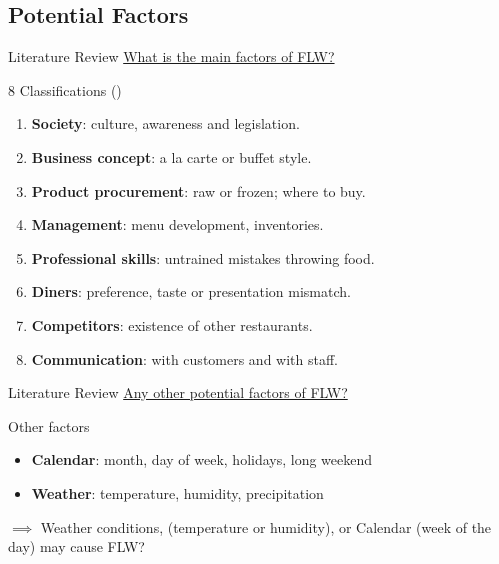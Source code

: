 \documentclass{beamer}
\begin{document}
\subsection{Potential Factors}
\begin{frame}{Literature Review}
    \underline{What is the main factors of FLW?}
    \begin{block}{8 Classifications (\cite{Heikkila2016-el})}
        \begin{enumerate}
            \item \textbf{Society}: \small culture, awareness and legislation.
            \item \textbf{Business concept}: \small a la carte or buffet style.
            \item \textbf{Product procurement}: \small raw or frozen; where to buy.
            \item \textbf{Management}: \small menu development, inventories.
            \item \textbf{Professional skills}: \small untrained mistakes throwing food.
            \item \textbf{Diners}: \small preference, taste or presentation mismatch.
            \item \textbf{Competitors}: \small existence of other restaurants.
            \item \textbf{Communication}: \small with customers and with staff.
        \end{enumerate}
    \end{block}    
\end{frame}

\begin{frame}{Literature Review}
    \underline{Any other potential factors of FLW?}
    \begin{block}{Other factors}
        \begin{itemize}
            \item \textbf{Calendar}: month, day of week, holidays, long weekend
            \item \textbf{Weather}: temperature, humidity, precipitation
        \end{itemize}       
    \end{block}
    $\implies$ Weather conditions, (temperature or humidity), or Calendar (week of the day) may cause FLW?
\end{frame}
\end{document}
